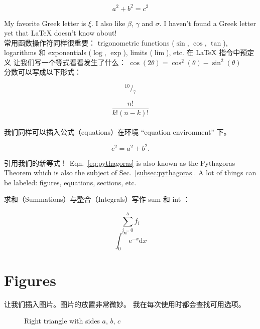 \documentclass[12pt]{article}
\begin{document}
\[a^2 + b^2 = c^2 \]

My favorite Greek letter is $\xi$. I also like $\beta$, $\gamma$ and $\sigma$.
I haven't found a Greek letter yet that \LaTeX \hspace{1pt} doesn't know
about! \\

常用函数操作符同样很重要： 
trigonometric functions ($\sin$, $\cos$, $\tan$), 
logarithms 和 exponentials ($\log$, $\exp$), 
limits ($\lim$), etc. 
在 LaTeX 指令中预定义 
让我们写一个等式看看发生了什么：
$\cos(2\theta) = \cos^{2}(\theta) - \sin^{2}(\theta)$ \\

分数可以写成以下形式：

$$ ^{10}/_{7} $$

$$ \frac{n!}{k!(n - k)!} $$ \\

我们同样可以插入公式（equations）在环境 ``equation environment'' 下。

\begin{equation} %
    c^2 = a^2 + b^2.
    \label{eq:pythagoras} %
\end{equation} %

引用我们的新等式！
Eqn.~\ref{eq:pythagoras} is also known as the Pythagoras Theorem which is also
the subject of Sec.~\ref{subsec:pythagoras}. A lot of things can be labeled: 
figures, equations, sections, etc.

求和（Summations）与整合（Integrals）写作 sum 和 int ：


\begin{equation} 
  \sum_{i=0}^{5} f_{i}
\end{equation} 
\begin{equation} 
  \int_{0}^{\infty} \mathrm{e}^{-x} \mathrm{d}x
\end{equation} 

\section{Figures}

让我们插入图片。图片的放置非常微妙。
我在每次使用时都会查找可用选项。

\begin{figure}[H] %
    \centering %
    \caption{Right triangle with sides $a$, $b$, $c$}
    \label{fig:right-triangle}
\end{figure}
\end{document}
